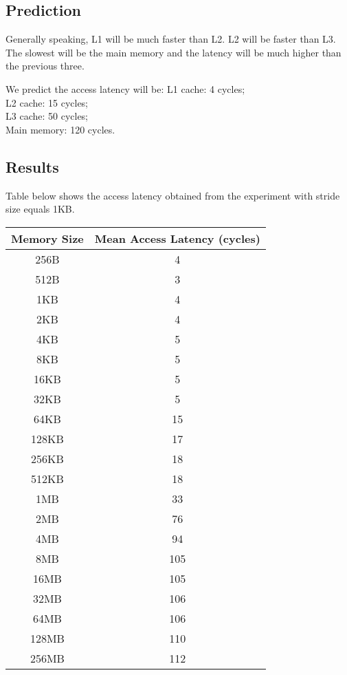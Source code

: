 \subsection{Prediction}
Generally speaking, L1 will be much faster than L2. L2 will be faster than L3. The slowest will be the main memory and the latency will be much higher than the previous three. 

We predict the access latency will be:
L1 cache: 4 cycles;\\
L2 cache: 15 cycles;\\
L3 cache: 50 cycles;\\
Main memory: 120 cycles.\\

\subsection{Results}
Table below shows the access latency obtained from the experiment with stride size equals 1KB.
\begin{center}
 \begin{tabular}{||c | c||}
 \hline
Memory Size & Mean Access Latency (cycles)\\ [0.5ex]
 \hline\hline
 256B & 4\\
 \hline
 512B & 3\\
 \hline
 1KB & 4\\
 \hline
 2KB & 4\\
 \hline
 4KB & 5\\
 \hline
 8KB & 5\\
 \hline
 16KB & 5\\
 \hline
 32KB & 5\\
 \hline
 64KB & 15\\
 \hline
 128KB & 17\\
 \hline
 256KB & 18\\
 \hline
 512KB & 18\\
 \hline
 1MB & 33\\
 \hline
 2MB & 76\\
 \hline
 4MB & 94\\
 \hline
 8MB & 105\\
 \hline
 16MB & 105\\
 \hline
 32MB & 106\\
 \hline
 64MB & 106\\
 \hline
 128MB & 110\\
 \hline
 256MB & 112\\
 \hline
 \end{tabular}
\end{center}

